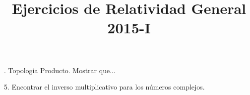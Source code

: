 \documentclass[english]{article}
\begin{document}
\title{Ejercicios de Relatividad General 2015-I}

. Topologia Producto. Mostrar que...

5. Encontrar el inverso multiplicativo para los n\'umeros complejos.
\end{document}

